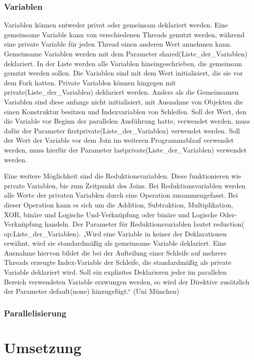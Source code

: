 \documentclass[../main.tex]{subfiles}
\begin{document}
\subsubsection{Variablen}

Variablen können entweder privat oder gemeinsam deklariert werden. Eine gemeinsame Variable kann von verschiedenen Threads genutzt werden, während eine private Variable für jeden Thread einen anderen Wert annehmen kann. Gemeinsame Variablen werden mit dem Parameter shared(Liste\_der\_Variablen) deklariert. In der Liste werden alle Variablen hineingeschrieben, die gemeinsam genutzt werden sollen. Die Variablen sind mit dem Wert initialisiert, die sie vor dem Fork hatten. Private Variablen können hingegen mit private(Liste\_der\_Variablen) deklariert werden.  Anders als die Gemeinsamen Variablen sind diese anfangs nicht initialisiert, mit Ausnahme von Objekten die einen Konstruktur besitzen und Indexvariablen von Schleifen.
Soll der Wert, den die Variable vor Beginn der parallelen Ausführung hatte, verwendet werden, muss dafür der Parameter firstprivate(Liste\_der\_Variablen) verwendet werden. Soll der Wert der Variable vor dem Join im weiteren Programmablauf verwendet werden, muss hierfür der Parameter lastprivate(Liste\_der\_Variablen) verwendet werden.

Eine weitere Möglichkeit sind die Reduktionsvariablen. Diese funktionieren wie private Variablen, bis zum Zeitpunkt des Joins. Bei Reduktionsvariablen werden alle Werte der privaten Variablen durch eine Operation zusammengefasst. Bei dieser Operation kann es sich um die Addition, Subtraktion, Multiplikation, XOR, binäre und Logische Und-Verknüpfung oder binäre und Logische Oder-Verknüpfung handeln. Der Parameter für Reduktionsvariablen lautet reduction( op:Liste\_der\_Variablen).
„Wird eine Variable in keiner der Deklarationen erwähnt, wird sie standardmäßig als gemeinsame Variable deklariert. Eine Ausnahme hiervon bildet die bei der Aufteilung einer Schleife auf mehrere Threads erzeugte Index-Variable der Schleife, die standardmäßig als private Variable deklariert wird. Soll ein explizites Deklarieren jeder im parallelen Bereich verwendeten Variable erzwungen werden, so wird der Direktive zusätzlich der Parameter default(none) hinzugefügt.“ (Uni München)

\subsubsection{Parallelisierung}


\section{Umsetzung}
\end{document}

